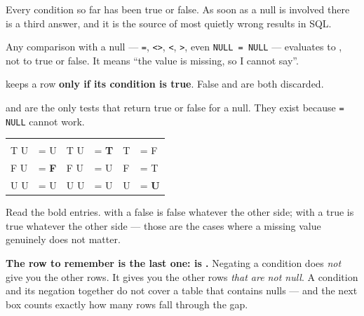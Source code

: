 Every condition so far has been true or false. As soon as a null is involved
there is a third answer, and it is the source of most quietly wrong results in
SQL.

\begin{definitionbox}[\unk{}]
Any comparison with a null --- \texttt{=}, \texttt{<>}, \texttt{<},
\texttt{>}, even \texttt{NULL = NULL} --- evaluates to \unk{}, not to
true or false. It means ``the value is missing, so I cannot say''.

\smallskip
{} keeps a row \textbf{only if its condition is true}. False and
\unk{} are both discarded.

\smallskip
{} and  are the only tests that return true
or false for a null. They exist because \texttt{= NULL} cannot work.
\end{definitionbox}

\begin{conceptbox}
\begin{tabular}{@{}L{1.9cm}L{1.9cm}|L{1.9cm}L{1.9cm}|L{2.2cm}L{2.4cm}@{}}
\textbf{} & & \textbf{} & & \textbf{} & \\
T  U & = U & T  U & = \textbf{T} &  T & = F \\
F  U & = \textbf{F} & F  U & = U &  F & = T \\
U  U & = U & U  U & = U &  U & = \textbf{U} \\
\end{tabular}

\smallskip
Read the bold entries.  with a false is false whatever the other
side;  with a true is true whatever the other side --- those are the
cases where a missing value genuinely does not matter.

\smallskip
\textbf{The row to remember is the last one:  \unk{} is
\unk{}.} Negating a condition does \emph{not} give you the other
rows. It gives you the other rows \emph{that are not null}. A condition and its
negation together do not cover a table that contains nulls --- and the next box
counts exactly how many rows fall through the gap.
\end{conceptbox}

